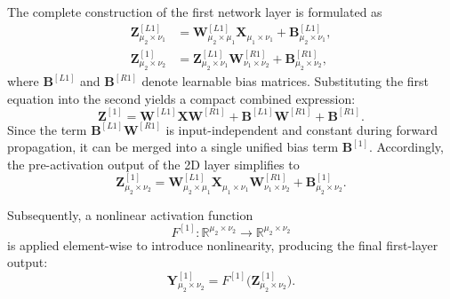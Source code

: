 \documentclass[pdflatex,sn-mathphys-num]{sn-jnl}%
\theoremstyle{thmstyleone}%
\theoremstyle{thmstyletwo}%
\theoremstyle{thmstylethree}%
\begin{document}
The complete construction of the first network layer is formulated as
\begin{align}
\boldsymbol{Z}^{[L1]}_{\mu_2 \times \nu_1} &= \boldsymbol{W}^{[L1]}_{\mu_2 \times \mu_1} \boldsymbol{X}_{\mu_1 \times \nu_1} + \boldsymbol{B}^{[L1]}_{\mu_2 \times \nu_1}, \\
\boldsymbol{Z}^{[1]}_{\mu_2 \times \nu_2}  &= \boldsymbol{Z}^{[L1]}_{\mu_2 \times \nu_1} \boldsymbol{W}^{[R1]}_{\nu_1 \times \nu_2} + \boldsymbol{B}^{[R1]}_{\mu_2 \times \nu_2},
\end{align}
where $\boldsymbol{B}^{[L1]}$ and $\boldsymbol{B}^{[R1]}$ denote learnable bias matrices. Substituting the first equation into the second yields a compact combined expression:
\[
\boldsymbol{Z}^{[1]}
=
\boldsymbol{W}^{[L1]} \boldsymbol{X} \boldsymbol{W}^{[R1]}
+ \boldsymbol{B}^{[L1]} \boldsymbol{W}^{[R1]}
+ \boldsymbol{B}^{[R1]}.
\]
Since the term $\boldsymbol{B}^{[L1]} \boldsymbol{W}^{[R1]}$ is input-independent and constant during forward propagation, it can be merged into a single unified bias term $\boldsymbol{B}^{[1]}$. Accordingly, the pre-activation output of the 2D layer simplifies to
\begin{equation}
\boldsymbol{Z}^{[1]}_{\mu_2 \times \nu_2}
=
\boldsymbol{W}^{[L1]}_{\mu_2 \times \mu_1}
\boldsymbol{X}_{\mu_1 \times \nu_1}
\boldsymbol{W}^{[R1]}_{\nu_1 \times \nu_2}
+ \boldsymbol{B}^{[1]}_{\mu_2 \times \nu_2}.
\end{equation}

Subsequently, a nonlinear activation function
\[
F^{[1]}: \mathbb{R}^{\mu_2 \times \nu_2} \to \mathbb{R}^{\mu_2 \times \nu_2}
\]
is applied element-wise to introduce nonlinearity, producing the final first-layer output:
\begin{equation}
\boldsymbol{Y}^{[1]}_{\mu_2 \times \nu_2}
=
F^{[1]}\bigl(\boldsymbol{Z}^{[1]}_{\mu_2 \times \nu_2}\bigr).
\end{equation}
\end{document}
